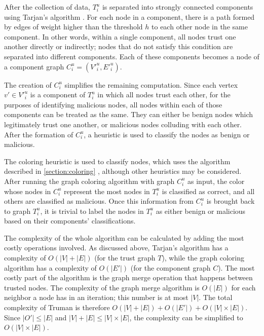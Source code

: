 \documentclass[conference]{IEEEtran}
\begin{document}
After the collection of data, $T^u_i$ is separated into strongly connected components using Tarjan's algorithm \cite{tarjan1972depth}.
For each node in a component, there is a path formed by edges of weight higher than the threshold $h$ to each other node in the same component.
In other words, within a single component, all nodes trust one another directly or indirectly; nodes that do not satisfy this condition are separated into different components.
Each of these components becomes a node of a component graph $C^u_i = (V'^u_i, E'^u_i)$.

The creation of $C^u_i$ simplifies the remaining computation.
Since each vertex $v' \in V'^u_i$ is a component of $T^u_i$ in which all nodes trust each other, for the purposes of identifying malicious nodes, all nodes within each of those components can be treated as the same.
They can either be benign nodes which legitimately trust one another, or malicious nodes colluding with each other.
After the formation of $C^u_i$, a heuristic is used to classify the nodes as benign or malicious.


The coloring heuristic is used to classify nodes, which uses the algorithm described in \autoref{section:coloring} \cite{mittal2011graph}, although other heuristics may be considered.
After running the graph coloring algorithm with graph $C^u_i$ as input, the color whose nodes in $C^u_i$ represent the most nodes in $T^u_i$ is classified as correct, and all others are classified as malicious.
Once this information from $C^u_i$ is brought back to graph $T^u_i$, it is trivial to label the nodes in $T^u_i$ as either benign or malicious based on their components' classifications.


The complexity of the whole algorithm can be calculated by adding the most costly operations involved.
As discussed above, Tarjan's algorithm has a complexity of $O(|V|+|E|)$ (for the trust graph $T$), while the graph coloring algorithm has a complexity of $O(|E'|)$ (for the component graph $C$).
The most costly part of the algorithm is the graph merge operation that happens between trusted nodes.
The complexity of the graph merge algorithm is $O(|E|)$ for each neighbor a node has in an iteration; this number is at most $|V|$.
The total complexity of Truman is therefore $O(|V|+|E|)+O(|E'|)+O(|V|\times |E|)$.
Since $|O'| \leq |E|$ and $|V|+|E| \leq |V|\times |E|$, the complexity can be simplified to $O(|V| \times |E|)$.
\end{document}
